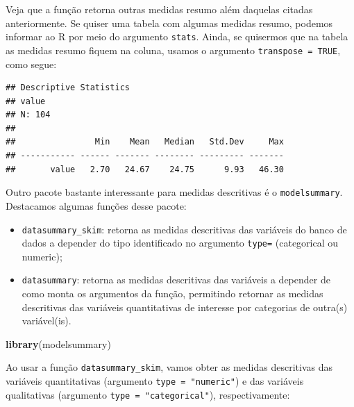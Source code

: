 \documentclass[
]{book}
\newenvironment{Shaded}{\begin{snugshade}}{\end{snugshade}}
\newcommand{\CommentTok}[1]{\textcolor[rgb]{0.56,0.35,0.01}{\textit{#1}}}
\newcommand{\DataTypeTok}[1]{\textcolor[rgb]{0.13,0.29,0.53}{#1}}
\newcommand{\KeywordTok}[1]{\textcolor[rgb]{0.13,0.29,0.53}{\textbf{#1}}}
\newcommand{\NormalTok}[1]{#1}
\newcommand{\OperatorTok}[1]{\textcolor[rgb]{0.81,0.36,0.00}{\textbf{#1}}}
\newcommand{\OtherTok}[1]{\textcolor[rgb]{0.56,0.35,0.01}{#1}}
\newcommand{\StringTok}[1]{\textcolor[rgb]{0.31,0.60,0.02}{#1}}
\begin{document}
Veja que a função retorna outras medidas resumo além daquelas citadas anteriormente. Se quiser uma tabela com algumas medidas resumo, podemos informar ao R por meio do argumento \texttt{stats}. Ainda, se quisermos que na tabela as medidas resumo fiquem na coluna, usamos o argumento \texttt{transpose\ =\ TRUE}, como segue:

\begin{Shaded}
\end{Shaded}

\begin{verbatim}
## Descriptive Statistics  
## value  
## N: 104  
## 
##                Min    Mean   Median   Std.Dev     Max
## ----------- ------ ------- -------- --------- -------
##       value   2.70   24.67    24.75      9.93   46.30
\end{verbatim}

Outro pacote bastante interessante para medidas descritivas é o \texttt{modelsummary}. Destacamos algumas funções desse pacote:

\begin{itemize}
\item
  \texttt{datasummary\_skim}: retorna as medidas descritivas das variáveis do banco de dados a depender do tipo identificado no argumento \texttt{type=} (categorical ou numeric);
\item
  \texttt{datasummary}: retorna as medidas descritivas das variáveis a depender de como monta os argumentos da função, permitindo retornar as medidas descritivas das variáveis quantitativas de interesse por categorias de outra(s) variável(is).
\end{itemize}

\begin{Shaded}
\begin{Highlighting}[]
\KeywordTok{library}\NormalTok{(modelsummary)}
\end{Highlighting}
\end{Shaded}

Ao usar a função \texttt{datasummary\_skim}, vamos obter as medidas descritivas das variáveis quantitativas (argumento \texttt{type\ =\ "numeric"}) e das variáveis qualitativas (argumento \texttt{type\ =\ "categorical"}), respectivamente:
\end{document}
